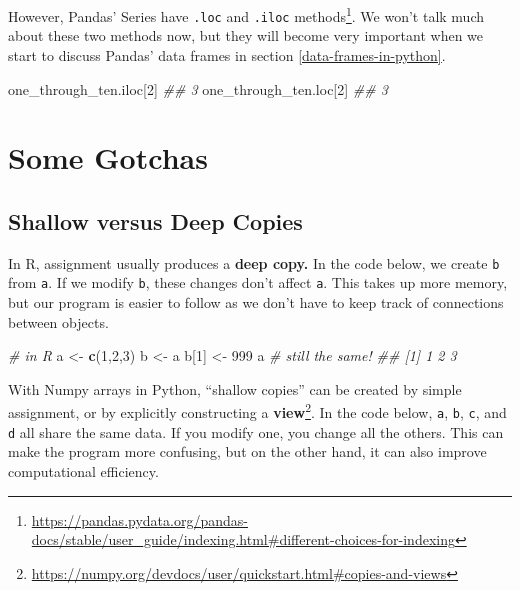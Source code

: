\documentclass[12pt,krantz2]{krantz}
\makeatletter
\newenvironment{Shaded}{\begin{snugshade}}{\end{snugshade}}
\newcommand{\CommentTok}[1]{\textcolor[rgb]{0.37,0.37,0.37}{\textit{#1}}}
\newcommand{\DecValTok}[1]{\textcolor[rgb]{0.06,0.06,0.06}{#1}}
\newcommand{\KeywordTok}[1]{\textcolor[rgb]{0.27,0.27,0.27}{\textbf{#1}}}
\newcommand{\NormalTok}[1]{#1}
\newcommand{\StringTok}[1]{\textcolor[rgb]{0.5,0.5,0.5}{#1}}
\renewcommand{\href}[2]{#2\footnote{\url{#1}}}
\newenvironment{kframe}{%
\medskip{}
\setlength{\fboxsep}{.8em}
 \def\at@end@of@kframe{}%
 \ifinner\ifhmode%
  \def\at@end@of@kframe{\end{minipage}}%
  \begin{minipage}{\columnwidth}%
 \fi\fi%
 \def\FrameCommand##1{\hskip\@totalleftmargin \hskip-\fboxsep
 \colorbox{shadecolor}{##1}\hskip-\fboxsep
     \hskip-\linewidth \hskip-\@totalleftmargin \hskip\columnwidth}%
 \MakeFramed {\advance\hsize-\width
   \@totalleftmargin\z@ \linewidth\hsize
   \@setminipage}}%
 {\par\unskip\endMakeFramed%
 \at@end@of@kframe}
\renewenvironment{Shaded}{\begin{kframe}}{\end{kframe}}
\makeatother
\begin{document}
However, \href{https://pandas.pydata.org/pandas-docs/stable/user_guide/indexing.html\#different-choices-for-indexing}{Pandas' Series have \texttt{.loc} and \texttt{.iloc} methods}. We won't talk much about these two methods now, but they will become very important when we start to discuss Pandas' data frames in section \ref{data-frames-in-python}.

\begin{Shaded}
\begin{Highlighting}[]
\NormalTok{one_through_ten.iloc[}\DecValTok{2}\NormalTok{]}
\CommentTok{## 3}
\NormalTok{one_through_ten.loc[}\DecValTok{2}\NormalTok{]}
\CommentTok{## 3}
\end{Highlighting}
\end{Shaded}

\hypertarget{some-gotchas}{%
\section{Some Gotchas}\label{some-gotchas}}

\hypertarget{shallow-versus-deep-copies}{%
\subsection{Shallow versus Deep Copies}\label{shallow-versus-deep-copies}}

In R, assignment usually produces a \textbf{deep copy.} In the code below, we create \texttt{b} from \texttt{a}. If we modify \texttt{b}, these changes don't affect \texttt{a}. This takes up more memory, but our program is easier to follow as we don't have to keep track of connections between objects.

\begin{Shaded}
\begin{Highlighting}[]
\CommentTok{# in R}
\NormalTok{a <-}\StringTok{ }\KeywordTok{c}\NormalTok{(}\DecValTok{1}\NormalTok{,}\DecValTok{2}\NormalTok{,}\DecValTok{3}\NormalTok{)}
\NormalTok{b <-}\StringTok{ }\NormalTok{a}
\NormalTok{b[}\DecValTok{1}\NormalTok{] <-}\StringTok{ }\DecValTok{999}
\NormalTok{a }\CommentTok{# still the same!}
\CommentTok{## [1] 1 2 3}
\end{Highlighting}
\end{Shaded}

With Numpy arrays in Python, \href{https://numpy.org/devdocs/user/quickstart.html\#copies-and-views}{``shallow copies'' can be created by simple assignment, or by explicitly constructing a \textbf{view}}. In the code below, \texttt{a}, \texttt{b}, \texttt{c}, and \texttt{d} all share the same data. If you modify one, you change all the others. This can make the program more confusing, but on the other hand, it can also improve computational efficiency.
\end{document}
